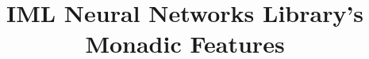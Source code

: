 \documentclass[]{article}
\title{IML Neural Networks Library's Monadic Features}
\author{}
\begin{document}
\maketitle

\begin{abstract}

\end{abstract}

\section{}
\end{document}
